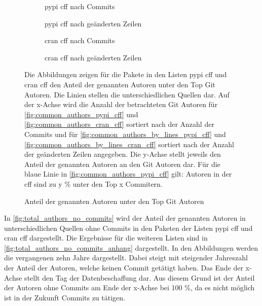 \begin{figure}
    \begin{subfigure}{.5\textwidth}
        \centering
        
        \caption{\gls{pypi} \gls{cff} nach Commits}
        \label{fig:common_authors_2_pypi_cff}
    \end{subfigure}%
    \begin{subfigure}{.5\textwidth}
        \centering
        
        \caption{\gls{pypi} \gls{cff} nach geänderten Zeilen}
        \label{fig:common_authors_2_by_lines_pypi_cff}
    \end{subfigure}
    \begin{subfigure}{.5\textwidth}
        \centering
        
        \caption{\gls{cran} \gls{cff} nach Commits}
        \label{fig:common_authors_2_cran_cff}
    \end{subfigure}%
    \begin{subfigure}{.5\textwidth}
        \centering
        
        \caption{\gls{cran} \gls{cff} nach geänderten Zeilen}
        \label{fig:common_authors_2_by_lines_cran_cff}
    \end{subfigure}
    \caption{Anteil der genannten Autoren unter den Top Git Autoren}
    \label{fig:common_authors_2}
    \small
    \raggedright
    Die Abbildungen zeigen für die Pakete in den Listen \gls{pypi} \gls{cff} und \gls{cran} \gls{cff} den Anteil der genannten Autoren unter den Top Git Autoren. Die Linien stellen die unterschiedlichen Quellen dar. Auf der x-Achse wird die Anzahl der betrachteten Git Autoren für \autoref{fig:common_authors_pypi_cff} und \autoref{fig:common_authors_cran_cff} sortiert nach der Anzahl der Commits und für \autoref{fig:common_authors_by_lines_pypi_cff} und \autoref{fig:common_authors_by_lines_cran_cff} sortiert nach der Anzahl der geänderten Zeilen angegeben. Die y-Achse stellt jeweils den Anteil der genannten Autoren an den Git Autoren dar. Für die blaue Linie in \autoref{fig:common_authors_pypi_cff} gilt: Autoren in der \gls{cff} sind zu y \% unter den Top x Commitern.
\end{figure}

In \autoref{fig:total_authors_no_commits} wird der Anteil der genannten Autoren in unterschiedlichen Quellen ohne Commits in den Paketen der Listen \gls{pypi} \gls{cff} und \gls{cran} \gls{cff} dargestellt.
Die Ergebnisse für die weiteren Listen sind in \autoref{fig:total_authors_no_commits_anhang} dargestellt.
In den Abbildungen werden die vergangenen zehn Jahre dargestellt.
Dabei steigt mit steigender Jahreszahl der Anteil der Autoren, welche keinen Commit getätigt haben.
Das Ende der x-Achse stellt den Tag der Datenbeschaffung dar.
Aus diesem Grund ist der Anteil der Autoren ohne Commits am Ende der x-Achse bei 100 \%, da es nicht möglich ist in der Zukunft Commits zu tätigen.

